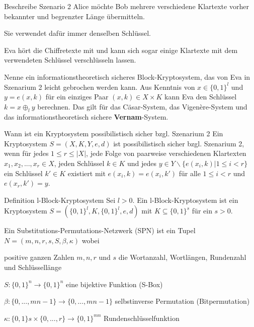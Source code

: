 \documentclass[avery5371, frame]{flashcards}
\begin{document}
\begin{flashcard}{Beschreibe Szenario 2}
    Alice möchte Bob mehrere verschiedene Klartexte vorher bekannter und begrenzter Länge übermitteln.

    Sie verwendet dafür immer denselben Schlüssel.

    Eva hört die Chiffretexte mit und kann sich sogar einige Klartexte mit dem verwendeten Schlüssel verschlüsseln lassen.
\end{flashcard}

\begin{flashcard}{Nenne ein informationstheoretisch sicheres Block-Kryptosystem, das von Eva in Szenarium 2 leicht gebrochen werden kann.}
    Aus Kenntnis von $x\in\{0,1\}^l$ und $y=e(x,k)$ für ein einziges Paar $(x,k)\in X\times K$ kann Eva den Schlüssel $k=x\oplus_l y$ berechnen. Das gilt für das Cäsar-System, das Vigenère-System und das informationstheoretisch sichere \textbf{Vernam}-System.
\end{flashcard}

\begin{flashcard}{Wann ist ein Kryptosystem possibilistisch sicher bzgl. Szenarium 2}
    Ein Kryptosystem $S=(X,K,Y,e,d)$ ist possibilistisch sicher bzgl. Szenarium 2, wenn für jedes $1 \leq r\leq |X|$, jede Folge von paarweise verschiedenen Klartexten $x_1,x_2,...,x_r\in X$, jeden Schlüssel $k\in K$ und jedes $y\in Y\backslash\{e(x_i,k)| 1 \leq i < r\}$ ein Schlüssel $k'\in K$ existiert mit $e(x_i,k)=e(x_i,k')$ für alle $1\leq i< r$ und $e(x_r,k')=y$.
\end{flashcard}

\begin{flashcard}{Definition l-Block-Kryptosystem}
    Sei $l>0$. Ein l-Block-Kryptosystem ist ein Kryptosystem $S=(\{0,1\}^l,K,\{0,1\}^l,e,d)$ mit $K\subseteq \{0,1\}^s$ für ein $s>0$.
\end{flashcard}

\begin{flashcard}{Ein Substitutions-Permutations-Netzwerk (SPN) ist ein Tupel $N=(m,n,r,s,S,\beta,\kappa)$ wobei}
    \begin{itemize*}
        \item positive ganzen Zahlen $m,n,r$ und $s$ die Wortanzahl, Wortlängen, Rundenzahl und Schlüssellänge
        \item $S:\{0,1\}^n\rightarrow\{0,1\}^n$ eine bijektive Funktion (S-Box)
        \item ${\beta}:\{0,...,mn-1\}\rightarrow\{0,...,mn-1\}$ selbstinverse Permutation (Bitpermutation)
        \item $\kappa :\{0,1\}s\times\{0,...,r\}\rightarrow\{0,1\}^{mn}$ Rundenschlüsselfunktion
    \end{itemize*}
\end{flashcard}
\end{document}
